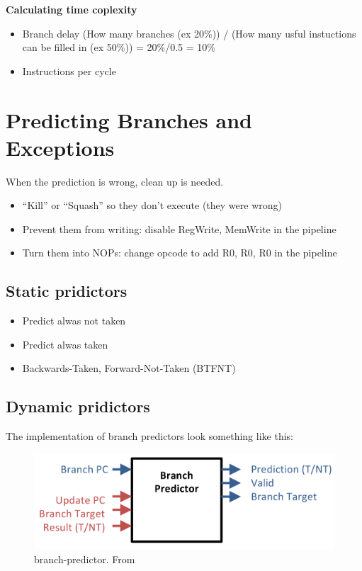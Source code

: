 \noindent\textbf{Calculating time coplexity}
\begin{itemize}
\item  Branch delay \newline
  (How many branches (ex 20\%)) / (How many usful instuctions can be filled in (ex 50\%))
  = 20\%/0.5 = 10\%
\item  Instructions per cycle  
\end{itemize}


\section{Predicting Branches and Exceptions}
When the prediction is wrong, clean up is needed.
\begin{itemize}
  \item “Kill” or “Squash” so they don't execute (they were wrong)
  \item Prevent them from writing: disable RegWrite, MemWrite in the pipeline
  \item Turn them into NOPs: change opcode to add R0, R0, R0 in the pipeline
\end{itemize}


\subsection{Static pridictors}
\begin{itemize}
\item  Predict alwas not taken
\item  Predict alwas taken
\item  Backwards-Taken, Forward-Not-Taken (BTFNT)
\end{itemize}


\subsection{Dynamic pridictors}

The implementation of branch predictors look something like this:
\begin{figure}[H]
    \centering
    \includegraphics[width=14cm]{image/branch-predictor.png} 
    \caption{branch-predictor. From \cite{ca}}
\end{figure}


